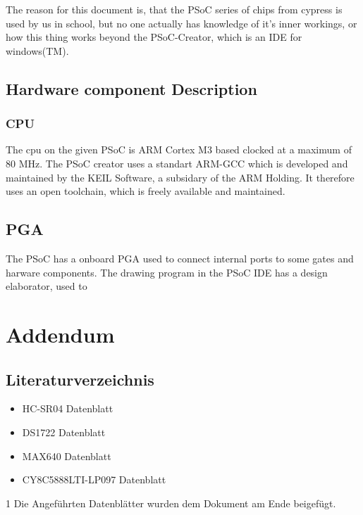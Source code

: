 \documentclass[12pt,a4paper]{article}
\def\datasheets{1}
\begin{document}
The reason for this document is, that the PSoC series of chips from cypress is
used by us in school, but no one actually has knowledge of it's inner workings,
or how this thing works beyond the PSoC-Creator, which is an IDE for 
windows(TM).

\subsection{Hardware component Description}

\subsubsection{CPU}

The cpu on the given PSoC is ARM Cortex M3 based clocked at a maximum of 80 MHz.
The PSoC creator uses a standart ARM-GCC which is developed and maintained by
the KEIL Software, a subsidary of the ARM Holding. It therefore uses an open
toolchain, which is freely available and maintained.

\subsection{PGA}

The PSoC has a onboard PGA used to connect internal ports to some gates and
harware components. The drawing program in the PSoC IDE has a design elaborator,
used to 


\fi

\section{Addendum}

\subsection{Literaturverzeichnis}

\begin{itemize}
	
	\item{HC-SR04 Datenblatt}
	\item{DS1722 Datenblatt}
	\item{MAX640 Datenblatt}
	\item{CY8C5888LTI-LP097 Datenblatt}

\end{itemize}

\if\datasheets1
	Die Angeführten Datenblätter wurden dem Dokument am Ende beigefügt.
\fi
\end{document}
